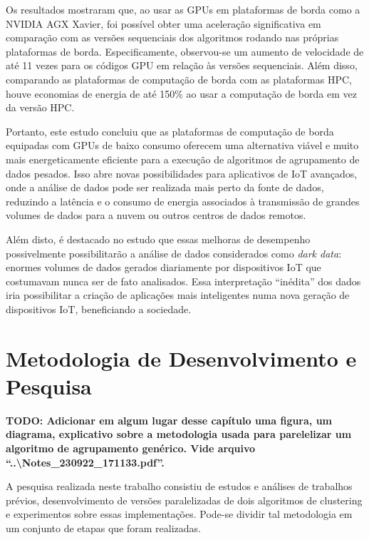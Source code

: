 \documentclass[12pt,
openright, 
oneside, %
a4paper,    %
brazil]{facom-ufu-abntex2}
\def\qntAlgrtm{dois}
\begin{document}
Os resultados mostraram que, ao usar as GPUs em plataformas de borda como a NVIDIA AGX Xavier, foi possível obter uma aceleração significativa em comparação com as versões sequenciais dos algoritmos rodando nas próprias plataformas de borda. Especificamente, observou-se um aumento de velocidade de até 11 vezes para os códigos GPU em relação às versões sequenciais. Além disso, comparando as plataformas de computação de borda com as plataformas HPC, houve economias de energia de até 150\% ao usar a computação de borda em vez da versão HPC.

Portanto, este estudo concluiu que as plataformas de computação de borda equipadas com GPUs de baixo consumo oferecem uma alternativa viável e muito mais energeticamente eficiente para a execução de algoritmos de agrupamento de dados pesados. Isso abre novas possibilidades para aplicativos de IoT avançados, onde a análise de dados pode ser realizada mais perto da fonte de dados, reduzindo a latência e o consumo de energia associados à transmissão de grandes volumes de dados para a nuvem ou outros centros de dados remotos.

Além disto, é destacado no estudo que essas melhoras de desempenho possivelmente possibilitarão a análise de dados considerados como \textit{dark data}: enormes volumes de dados gerados diariamente por dispositivos IoT que costumavam nunca ser de fato analisados. Essa interpretação \enquote{inédita} dos dados iria possibilitar a criação de aplicações mais inteligentes numa nova geração de dispositivos IoT, beneficiando a sociedade.





\chapter{Metodologia de Desenvolvimento e Pesquisa}

\textbf{TODO: Adicionar em algum lugar desse capítulo uma figura, um diagrama, explicativo sobre a metodologia usada para parelelizar um algoritmo de agrupamento genérico. Vide arquivo \enquote{..\textbackslash Notes\_230922\_171133.pdf}.}


A pesquisa realizada neste trabalho consistiu de estudos e análises de trabalhos prévios, desenvolvimento de versões paralelizadas de \qntAlgrtm{} algoritmos de clustering e experimentos sobre essas implementações. Pode-se dividir tal metodologia em um conjunto de etapas que foram realizadas.
\end{document}

